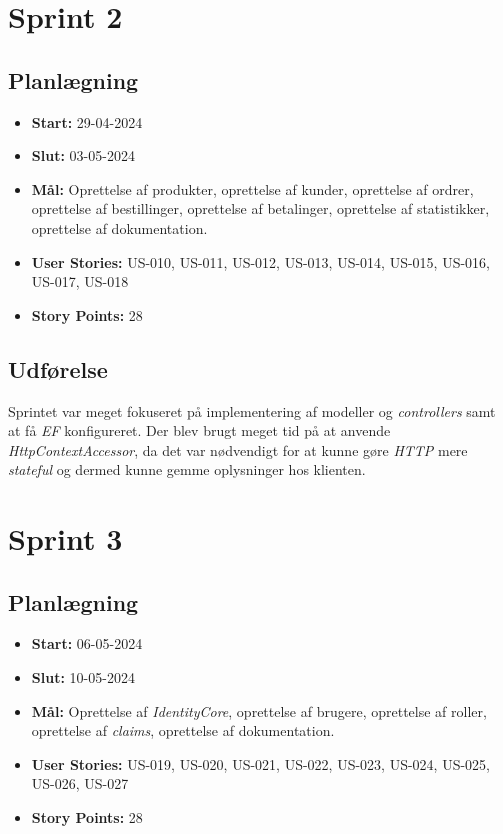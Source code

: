 \section{Sprint 2}
\label{sec:sprint-2}
\subsection{Planlægning}
\label{subsec:sprint-2-plan}
\begin{itemize}
    \item \textbf{Start:} 29-04-2024
    \item \textbf{Slut:} 03-05-2024
    \item \textbf{Mål:} Oprettelse af produkter, oprettelse af kunder, oprettelse af ordrer, oprettelse af bestillinger, oprettelse af betalinger, oprettelse af statistikker, oprettelse af dokumentation.
    \item \textbf{User Stories:} US-010, US-011, US-012, US-013, US-014, US-015, US-016, US-017, US-018
    \item \textbf{Story Points:} 28
\end{itemize}

\subsection{Udførelse}
\label{subsec:sprint-2-udforelse}
Sprintet var meget fokuseret på implementering af modeller og \emph{controllers} samt at få \emph{EF} konfigureret. 
Der blev brugt meget tid på at anvende \emph{HttpContextAccessor}, da det var nødvendigt for at kunne gøre \emph{HTTP} mere \emph{stateful} og dermed kunne gemme oplysninger hos klienten.

\section{Sprint 3}
\label{sec:sprint-3}
\subsection{Planlægning}
\label{subsec:sprint-3-plan}
\begin{itemize}
    \item \textbf{Start:} 06-05-2024
    \item \textbf{Slut:} 10-05-2024
    \item \textbf{Mål:} Oprettelse af \emph{IdentityCore}, oprettelse af brugere, oprettelse af roller, oprettelse af \emph{claims}, oprettelse af dokumentation.
    \item \textbf{User Stories:} US-019, US-020, US-021, US-022, US-023, US-024, US-025, US-026, US-027
    \item \textbf{Story Points:} 28
\end{itemize}

